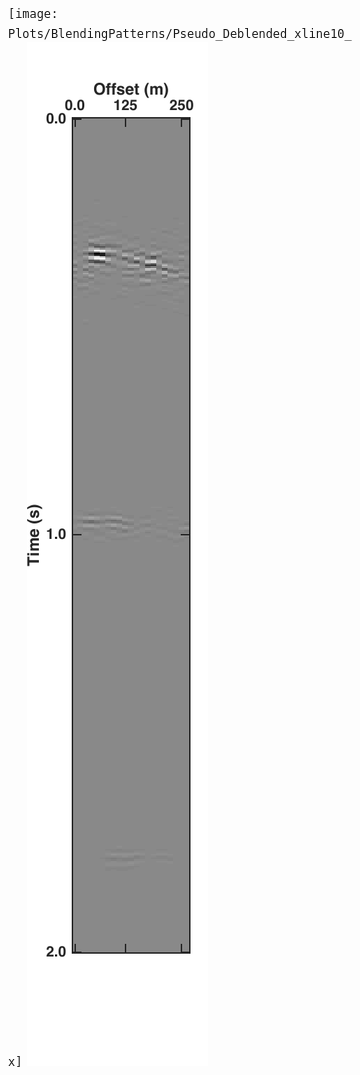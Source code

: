 \begin{figure}
\begin{subfigure}[t]{0.16\textwidth}
		\caption{}
		\label{fig:Ch-Results-Unbl-inline10}
	\end{subfigure}
	\centering
	\begin{subfigure}[t]{0.26\textwidth}
		\centering
		\texttt{[image: Plots/BlendingPatterns/Pseudo\_Deblended\_xline10\_x]}
		\includegraphics[height = 0.38\textheight]{Plots/BlendingPatterns/Deblended_xline10x}

\end{subfigure}
\end{figure}
